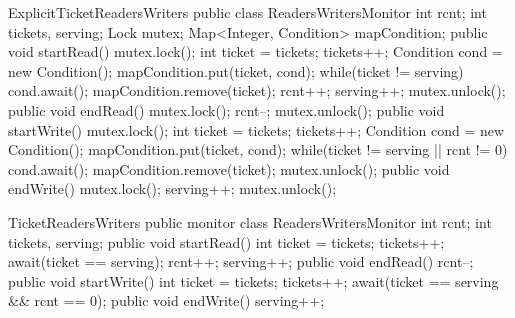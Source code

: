 \documentclass[10pt, conference, compsocconf]{IEEEtran}
\begin{document}
%
%

\begin{SaveVerbatim}{ExplicitTicketReadersWriters}
public class ReadersWritersMonitor {
  int rcnt;
  int tickets, serving;
  Lock mutex;
  Map<Integer, Condition> mapCondition;
  public void startRead() {
    mutex.lock();
    int ticket = tickets;
    tickets++;
    Condition cond = new Condition();
    mapCondition.put(ticket, cond);
    while(ticket != serving) {
      cond.await();
    }
    mapCondition.remove(ticket);
    rcnt++;
    serving++;
    mutex.unlock();
  }
  public void endRead() {
    mutex.lock();
    rcnt--;
    mutex.unlock();
  }
  public void startWrite() {
    mutex.lock();
    int ticket = tickets;
    tickets++;
    Condition cond = new Condition();
    mapCondition.put(ticket, cond);
    while(ticket != serving || rcnt != 0) {
      cond.await();
    }
    mapCondition.remove(ticket);
    mutex.unlock();
  }
  public void endWrite() {
    mutex.lock();
    serving++;
    mutex.unlock();
  }
}
\end{SaveVerbatim}
\begin{SaveVerbatim}{TicketReadersWriters}
public monitor class ReadersWritersMonitor {
  int rcnt;
  int tickets, serving;
  public void startRead() {
    int ticket = tickets;
    tickets++;
    await(ticket == serving);
    rcnt++;
    serving++;
  }
  public void endRead() {
    rcnt--;
  }
  public void startWrite() {
    int ticket = tickets;
    tickets++;
    await(ticket == serving && rcnt == 0);
  }
  public void endWrite() {
    serving++;
  }
}
\end{SaveVerbatim}
\end{document}
